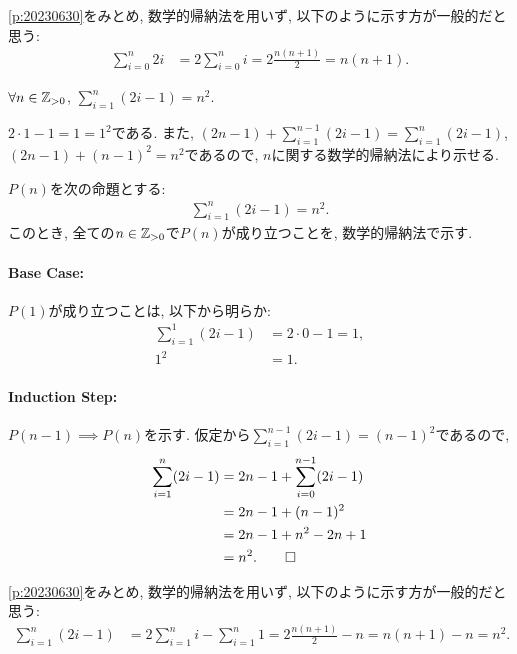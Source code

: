\begin{rem}
  \cref{p:20230630}をみとめ,
  数学的帰納法を用いず, 以下のように示す方が一般的だと思う:
  \begin{align*}
    \sum_{i=0}^{n}2i&=
    2\sum_{i=0}^{n}i
    =2\frac{n(n+1)}{2}=n(n+1).
  \end{align*}
\end{rem}

\begin{prop}
  \label{p:20230704}
  $\forall n\in\mathbb{Z}_{>0}$, $\sum_{i=1}^{n}(2i-1)=n^2$.
\end{prop}

\begin{proof**}
  $2\cdot 1-1=1=1^2$である.
  また,
  $(2n-1)+\sum_{i=1}^{n-1}(2i-1)=\sum_{i=1}^{n}(2i-1)$,
  $(2n-1)+(n-1)^2=n^2$であるので,
  $n$に関する数学的帰納法により示せる.
\end{proof**}

\begin{proof*}
  $P(n)$を次の命題とする:
  \begin{align*}
    \sum_{i=1}^{n}(2i-1)=n^2.
  \end{align*}
  このとき,
  全ての$n\in\mathbb{Z}_{>0}$で$P(n)$が成り立つことを,
  数学的帰納法で示す.

  \paragraph{Base Case:}
  $P(1)$が成り立つことは, 以下から明らか:
  \begin{align*}
    \sum_{i=1}^{1}(2i-1)&=2\cdot 0-1=1,\\
    1^2&=1.
  \end{align*}

  \paragraph{Induction Step:}
  $P(n-1)\implies P(n)$を示す.
  仮定から$\sum_{i=1}^{n-1}(2i-1)=(n-1)^2$であるので,
  \begin{align*}
    \sum_{i=1}^{n}(2i-1)&=2n-1+\sum_{i=0}^{n-1}(2i-1)\\
    &=2n-1+(n-1)^2\\
    &=2n-1+n^2-2n+1\\
    &=n^2.
    \qedhere
  \end{align*}
\end{proof*}

\begin{rem}
  \cref{p:20230630}をみとめ,
  数学的帰納法を用いず, 以下のように示す方が一般的だと思う:
  \begin{align*}
    \sum_{i=1}^{n}(2i-1)&=
    2\sum_{i=1}^{n}i-\sum_{i=1}^n 1
    =2\frac{n(n+1)}{2}-n=n(n+1)-n=n^2.
  \end{align*}
\end{rem}

